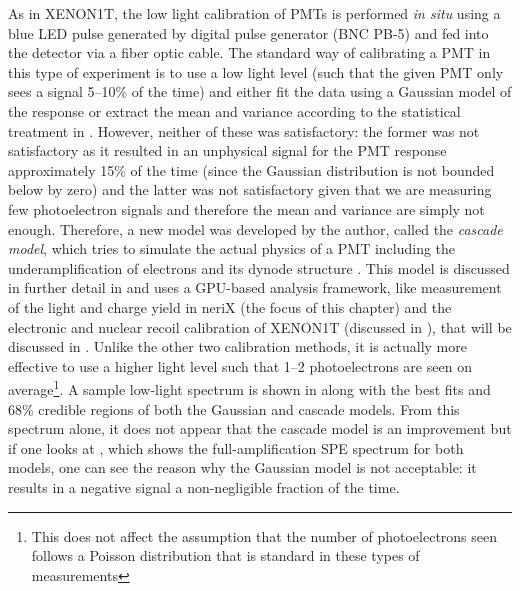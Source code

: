As in XENON1T, the low light calibration of PMTs is performed \textit{in situ} using a blue LED pulse generated by digital pulse generator (BNC PB-5) and fed into the detector via a fiber optic cable.  The standard way of calibrating a PMT in this type of experiment is to use a low light level (such that the given PMT only sees a signal 5--10\% of the time) and either fit the data using a Gaussian model of the response or extract the mean and variance according to the statistical treatment in .  However, neither of these was satisfactory: the former was not satisfactory as it resulted in an unphysical signal for the PMT response approximately 15\% of the time (since the Gaussian distribution is not bounded below by zero) and the latter was not satisfactory given that we are measuring few photoelectron signals and therefore the mean and variance are simply not enough.  Therefore, a new model was developed by the author, called the \textit{cascade model}, which tries to simulate the actual physics of a PMT including the underamplification of electrons and its dynode structure \cite{anthony2017characterization}.  This model is discussed in further detail in  and uses a GPU-based analysis framework, like measurement of the light and charge yield in neriX (the focus of this chapter) and the electronic and nuclear recoil calibration of XENON1T (discussed in ), that will be discussed in .  Unlike the other two calibration methods, it is actually more effective to use a higher light level such that 1--2 photoelectrons are seen on average\footnote{This does not affect the assumption that the number of photoelectrons seen follows a Poisson distribution that is standard in these types of measurements}.  A sample low-light spectrum is shown in  along with the best fits and 68\% credible regions of both the Gaussian and cascade models.  From this spectrum alone, it does not appear that the cascade model is an improvement but if one looks at , which shows the full-amplification SPE spectrum for both models, one can see the reason why the Gaussian model is not acceptable: it results in a negative signal a non-negligible fraction of the time.


